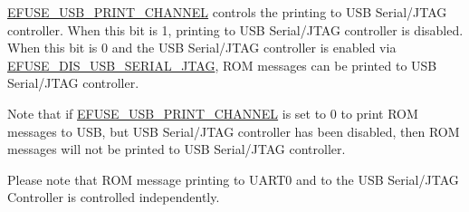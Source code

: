 \documentclass[main\_\_EN.tex]{subfiles}
\begin{document}
\hyperref[fielddesc:EFUSEUSBPRINTCHANNEL]{EFUSE\_USB\_PRINT\_CHANNEL} controls the printing to USB Serial/JTAG controller. When this bit is 1, printing to USB Serial/JTAG controller is disabled. When this bit is 0 and the USB Serial/JTAG controller is enabled via \hyperref[fielddesc:EFUSEDISUSBSERIALJTAG]{EFUSE\_DIS\_USB\_SERIAL\_JTAG}, ROM messages can be printed to USB Serial/JTAG controller.

Note that if \hyperref[fielddesc:EFUSEUSBPRINTCHANNEL]{EFUSE\_USB\_PRINT\_CHANNEL} is set to 0 to print ROM messages to USB, but USB Serial/JTAG controller has been disabled, then ROM messages will not be printed to USB Serial/JTAG controller.

Please note that ROM message printing to UART0 and to the USB Serial/JTAG Controller is controlled independently.
\end{document}
